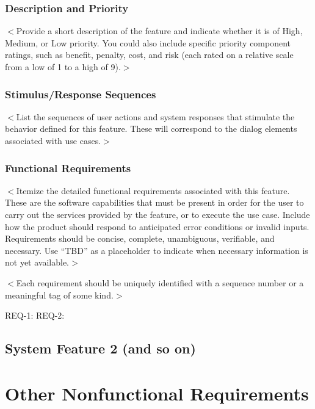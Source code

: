 \documentclass{scrreprt}
\begin{document}
\subsection{Description and Priority}
\begin{CJK}{UTF8}{<font>}
$<$Provide a short description of the feature and indicate whether it is of 
High, Medium, or Low priority. You could also include specific priority 
component ratings, such as benefit, penalty, cost, and risk (each rated on a 
relative scale from a low of 1 to a high of 9).$>$
\end{CJK}

\subsection{Stimulus/Response Sequences}
\begin{CJK}{UTF8}{<font>}
$<$List the sequences of user actions and system responses that stimulate the 
behavior defined for this feature. These will correspond to the dialog elements 
associated with use cases.$>$
\end{CJK}

\subsection{Functional Requirements}
\begin{CJK}{UTF8}{<font>}
$<$Itemize the detailed functional requirements associated with this feature.  
These are the software capabilities that must be present in order for the user 
to carry out the services provided by the feature, or to execute the use case.  
Include how the product should respond to anticipated error conditions or 
invalid inputs. Requirements should be concise, complete, unambiguous, 
verifiable, and necessary. Use “TBD” as a placeholder to indicate when necessary 
information is not yet available.$>$
\end{CJK}

$<$Each requirement should be uniquely identified with a sequence number or a 
meaningful tag of some kind.$>$

REQ-1:	REQ-2:

\section{System Feature 2 (and so on)}


\chapter{Other Nonfunctional Requirements}
\end{document}

